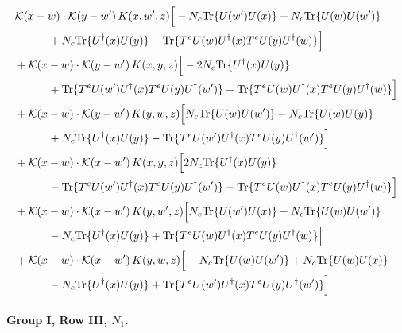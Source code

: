 \documentclass[10pt]{article}
\numberwithin{equation}{section}
\begin{document}
\begin{align}
&\mathcal K(x-w)\cdot\mathcal K(y-w')\,K(x,w',z)\Big[-N_c{\rm Tr}\{U(w')U(x)\}+N_c{\rm Tr}\{U(w)U(w')\}\notag\\
&\quad\quad\quad+N_c{\rm Tr}\{U^\dagger(x)U(y)\}-{\rm Tr}\{T^eU(w)U^\dagger(x)T^eU(y)U^\dagger(w)\}\Big]\notag\\
&+\mathcal K(x-w)\cdot\mathcal K(y-w')\,K(x,y,z)\Big[-2 N_c{\rm Tr}\{U^\dagger(x)U(y)\}\notag\\
&\quad\quad\quad+{\rm Tr}\{T^eU(w')U^\dagger(x)T^eU(y)U^\dagger(w')\}+{\rm Tr}\{T^eU(w)U^\dagger(x)T^eU(y)U^\dagger(w)\}\Big]\notag\\
&+\mathcal K(x-w)\cdot\mathcal K(y-w')\,K(y,w,z)\Big[N_c{\rm Tr}\{U(w)U(w')\}-N_c{\rm Tr}\{U(w)U(y)\}\notag\\
&\quad\quad\quad+N_c{\rm Tr}\{U^\dagger(x)U(y)\}-{\rm Tr}\{T^eU(w')U^\dagger(x)T^eU(y)U^\dagger(w')\}\Big]\notag\\
&+\mathcal K(x-w)\cdot\mathcal K(x-w')\,K(x,y,z)\Big[2 N_c{\rm Tr}\{U^\dagger(x)U(y)\}\notag\\
&\quad\quad\quad-{\rm Tr}\{T^eU(w')U^\dagger(x)T^eU(y)U^\dagger(w')\}-{\rm Tr}\{T^eU(w)U^\dagger(x)T^eU(y)U^\dagger(w)\}\Big]\notag\\
&+\mathcal K(x-w)\cdot\mathcal K(x-w')\,K(y,w',z)\Big[N_c{\rm Tr}\{U(w')U(x)\}-N_c{\rm Tr}\{U(w)U(w')\}\notag\\
&\quad\quad\quad-N_c{\rm Tr}\{U^\dagger(x)U(y)\}+{\rm Tr}\{T^eU(w)U^\dagger(x)T^eU(y)U^\dagger(w)\}\Big]\notag\\
&+\mathcal K(x-w)\cdot\mathcal K(x-w')\,K(y,w,z)\Big[-N_c{\rm Tr}\{U(w)U(w')\}+N_c{\rm Tr}\{U(w)U(x)\}\notag\\
&\quad\quad\quad-N_c{\rm Tr}\{U^\dagger(x)U(y)\}+{\rm Tr}\{T^eU(w')U^\dagger(x)T^eU(y)U^\dagger(w')\}\Big]
\label{eq:list7}
\end{align}

\paragraph{Group I, Row III, $N_1$.}
\end{document}
